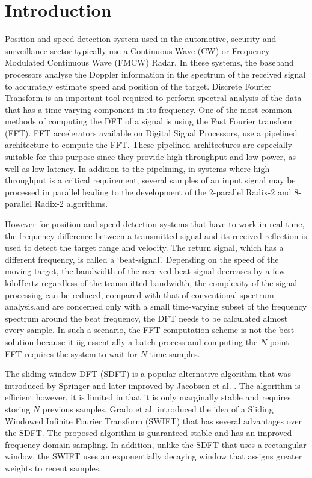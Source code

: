 \section{Introduction}
\label{Sec:Introduction}

Position and speed detection system used in the automotive, security and surveillance sector typically use a Continuous Wave (CW) or Frequency Modulated Continuous Wave (FMCW) Radar. In these systems, the baseband processors analyse the Doppler information in the spectrum of the received signal to accurately estimate speed and position of the target. Discrete Fourier Transform is an important tool required to perform spectral analysis of the data that has a time varying component in its frequency. One of the most common methods of computing the DFT of a signal is using the Fast Fourier transform (FFT). FFT accelerators available on Digital Signal Processors, use a pipelined architecture to compute the FFT. These pipelined architectures are especially suitable for this purpose since they provide high throughput and low power, as well as low latency\cite{Mookherjee2015}. In addition to the pipelining, in systems where high throughput is a critical requirement, several samples of an input signal may be processed in parallel leading to the development of the 2-parallel Radix-2 \cite{Ayinala2012} and 8-parallel Radix-2 \cite{Mookherjee2015} algorithms. 

However for position and speed detection systems that have to work in real time, the frequency difference between a transmitted signal and its received reflection is used to detect the target range and velocity. The return signal, which has a different frequency, is called a ‘beat-signal’. Depending on the speed of the moving target, the bandwidth of the received beat-signal decreases by a few kiloHertz regardless of the transmitted bandwidth, the complexity of the signal processing can be reduced, compared with that of conventional spectrum analysis.and are concerned only with a small time-varying subset of the frequency spectrum around the beat frequency, the DFT needs to be calculated almost every sample. In such a scenario, the FFT computation scheme is not the best solution because it iig essentially a batch process and computing the $N$-point FFT requires the system to wait for $N$ time samples. 

The sliding window DFT (SDFT) is a popular alternative algorithm that was introduced by Springer \cite{Springer1988} and later improved by Jacobsen et al. \cite{Jacobsen2003}. The algorithm is efficient however, it is limited in that it is only marginally stable and requires storing $N$
previous samples. Grado et al. \cite{Grado2017} introduced the idea of a Sliding Windowed Infinite Fourier Transform (SWIFT) that has several advantages over the SDFT. The proposed algorithm is guaranteed stable and has an improved frequency domain sampling. In addition, unlike the SDFT that uses a rectangular window, the SWIFT uses an exponentially decaying window that assigns greater weights to recent samples. 

